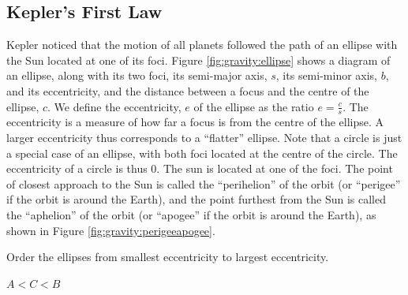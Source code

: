 \subsection{Kepler's First Law}
Kepler noticed that the motion of all planets followed the path of an ellipse with the Sun located at one of its foci. Figure \ref{fig:gravity:ellipse} shows a diagram of an ellipse, along with its two foci, its semi-major axis, $s$, its semi-minor axis, $b$, and its eccentricity, and the distance between a focus and the centre of the ellipse, $c$. We define the eccentricity, $e$ of the ellipse as the ratio $e=\frac{c}{s}$. The eccentricity is a measure of how far a focus is from the centre of the ellipse. A larger eccentricity thus corresponds to a ``flatter'' ellipse. Note that a circle is just a special case of an ellipse, with both foci located at the centre of the circle. The eccentricity of a circle is thus 0.
The sun is located at one of the foci. The point of closest approach to the Sun is called the ``perihelion'' of the orbit (or ``perigee'' if the orbit is around the Earth), and the point furthest from the Sun is called the ``aphelion'' of the orbit (or ``apogee'' if the orbit is around the Earth), as shown in Figure \ref{fig:gravity:perigeeapogee}.
\begin{checkpoint} Order the ellipses from smallest eccentricity to largest eccentricity.
\begin{answer}
$A<C<B$
\end{answer}
\end{checkpoint}
